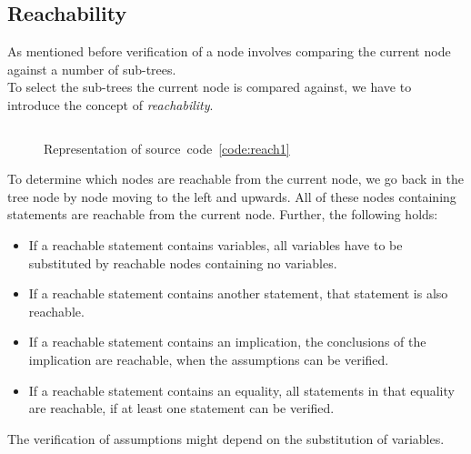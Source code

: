 \documentclass[british]{article}
\newenvironment{code}{\captionsetup{type=listing}}{}
\newcommand\prv{bc}
\begin{document}
\pagebreak{}

\subsection{Reachability}


As mentioned before verification of a node involves comparing the current node
against a number of sub-trees.\\ To select the sub-trees the current node is
compared against, we have to introduce the concept of \emph{reachability}.


\begin{code}
\label{code:reach1}
\inputminted[linenos]{\prv}{examples/reach1.prove}
\end{code}

\begin{figure}[!h]
\caption{Representation of source~code~\ref{code:reach1}}\label{fig:reach1}
\centering
{}
\end{figure}

To determine which nodes are reachable from the current node, we go back in the
tree node by node moving to the left and upwards. All of these nodes containing
statements are reachable from the current node. Further, the following holds:

\begin{itemize}
	\item
		If a reachable statement contains variables, all variables have to be
		substituted by reachable nodes containing no variables.
	\item
		If a reachable statement contains another statement, that statement is
		also reachable.
	\item
		If a reachable statement contains an implication, the conclusions of the
		implication are reachable, when the assumptions can be verified. 
	\item
		If a reachable statement contains an equality, all statements in that
		equality are reachable, if at least one statement can be verified.
\end{itemize}

The verification of assumptions might depend on the substitution of variables.
\newline
\end{document}
